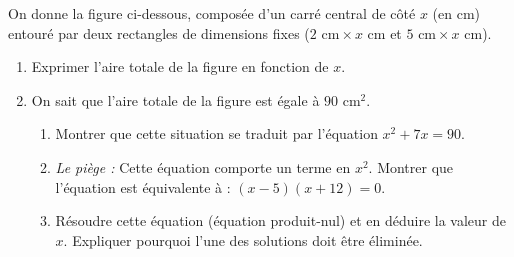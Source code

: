 \documentclass[a4paper]{book}
\begin{document}
\newpage %

    \begin{exercice}
        On donne la figure ci-dessous, composée d'un carré central de côté $x$ (en cm) entouré par deux rectangles de dimensions fixes ($2\text{ cm} \times x\text{ cm}$ et $5\text{ cm} \times x\text{ cm}$).
        
        \begin{center}
        \end{center}
        
        \begin{enumerate}
            \item Exprimer l'aire totale de la figure en fonction de $x$.
            \item On sait que l'aire totale de la figure est égale à $90\text{ cm}^2$. 
            \begin{enumerate}
                \item Montrer que cette situation se traduit par l'équation $x^2 + 7x = 90$.
                \item \textit{Le piège :} Cette équation comporte un terme en $x^2$. Montrer que l'équation est équivalente à : $(x - 5)(x + 12) = 0$.
                \item Résoudre cette équation (équation produit-nul) et en déduire la valeur de $x$. Expliquer pourquoi l'une des solutions doit être éliminée.
            \end{enumerate}
        \end{enumerate}
    \end{exercice}
\end{document}
